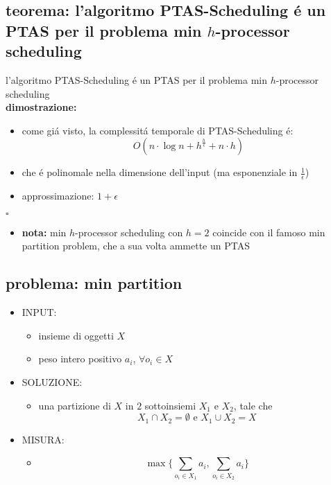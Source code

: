 
\subsection*{teorema: l'algoritmo PTAS-Scheduling \'e un PTAS per il problema min $h$-processor scheduling}
\begin{flushleft}
	l'algoritmo PTAS-Scheduling \'e un PTAS per il problema min $h$-processor scheduling \newline \\
	\textbf{dimostrazione:}
	\begin{itemize}
		\item come gi\'a visto, la complessit\'a temporale di PTAS-Scheduling \'e:
			$$O(n\cdot\log n+h^\frac{h}{\epsilon}+n\cdot h)$$
		\item che \'e polinomale nella dimensione dell'input (ma esponenziale in $\frac{1}{\epsilon}$)
		\item approssimazione: $1+\epsilon$
	\end{itemize}
	\hfill$\square$
	\begin{itemize}
		\item \textbf{nota:} min $h$-processor scheduling con $h=2$ coincide con il famoso min partition problem, che a sua volta ammette un PTAS
	\end{itemize}
\end{flushleft}


\subsection*{problema: min partition}
\begin{flushleft}
	\begin{itemize}
		\item INPUT:
		\begin{itemize}
			\item insieme di oggetti $X$
			\item peso intero positivo $a_i$, $\forall o_i\in X$
		\end{itemize}
		\item SOLUZIONE:
		\begin{itemize}
			\item una partizione di $X$ in $2$ sottoinsiemi $X_1$ e $X_2$, tale che
				$$X_1\cap X_2=\emptyset\text{ e }X_1\cup X_2=X$$
		\end{itemize}
		\item MISURA:
		\begin{itemize}
			\item[] $$\max\{\sum_{o_i\in X_1}a_i,\sum_{o_i\in X_2}a_i\}$$
		\end{itemize}
	\end{itemize}
\end{flushleft}

